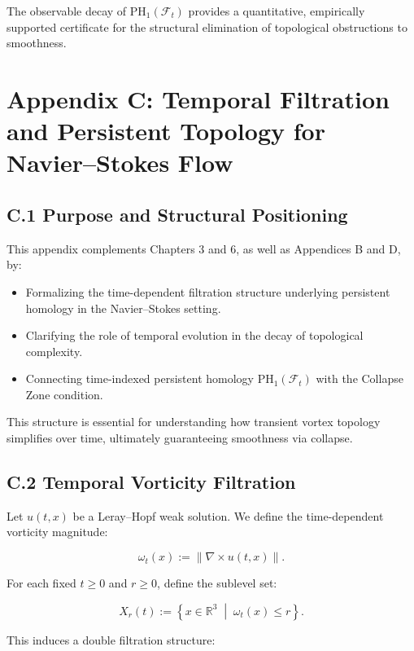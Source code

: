 \documentclass[11pt]{article}
\begin{document}
The observable decay of \( \mathrm{PH}_1(\mathcal{F}_t) \) provides a quantitative, empirically supported certificate for the structural elimination of topological obstructions to smoothness.



\section*{Appendix C: Temporal Filtration and Persistent Topology for Navier–Stokes Flow}

\subsection*{C.1 Purpose and Structural Positioning}

This appendix complements Chapters 3 and 6, as well as Appendices B and D, by:

\begin{itemize}
  \item Formalizing the time-dependent filtration structure underlying persistent homology in the Navier–Stokes setting.
  \item Clarifying the role of temporal evolution in the decay of topological complexity.
  \item Connecting time-indexed persistent homology \( \mathrm{PH}_1(\mathcal{F}_t) \) with the Collapse Zone condition.
\end{itemize}

This structure is essential for understanding how transient vortex topology simplifies over time, ultimately guaranteeing smoothness via collapse.

\subsection*{C.2 Temporal Vorticity Filtration}

Let \( u(t, x) \) be a Leray–Hopf weak solution. We define the time-dependent vorticity magnitude:

\[
\omega_t(x) := \| \nabla \times u(t, x) \|.
\]

For each fixed \( t \geq 0 \) and \( r \geq 0 \), define the sublevel set:

\[
X_r(t) := \left\{ x \in \mathbb{R}^3 \;\middle|\; \omega_t(x) \leq r \right\}.
\]

This induces a double filtration structure:
\end{document}
